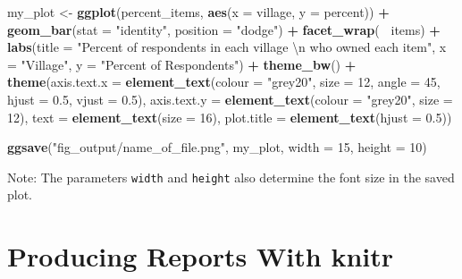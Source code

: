 \documentclass[]{book}
\newenvironment{Shaded}{\begin{snugshade}}{\end{snugshade}}
\newcommand{\KeywordTok}[1]{\textcolor[rgb]{0.13,0.29,0.53}{\textbf{#1}}}
\newcommand{\DataTypeTok}[1]{\textcolor[rgb]{0.13,0.29,0.53}{#1}}
\newcommand{\DecValTok}[1]{\textcolor[rgb]{0.00,0.00,0.81}{#1}}
\newcommand{\FloatTok}[1]{\textcolor[rgb]{0.00,0.00,0.81}{#1}}
\newcommand{\CharTok}[1]{\textcolor[rgb]{0.31,0.60,0.02}{#1}}
\newcommand{\StringTok}[1]{\textcolor[rgb]{0.31,0.60,0.02}{#1}}
\newcommand{\OperatorTok}[1]{\textcolor[rgb]{0.81,0.36,0.00}{\textbf{#1}}}
\newcommand{\NormalTok}[1]{#1}
\begin{document}
\begin{Shaded}
\begin{Highlighting}[]
\NormalTok{my_plot <-}\StringTok{ }\KeywordTok{ggplot}\NormalTok{(percent_items, }\KeywordTok{aes}\NormalTok{(}\DataTypeTok{x =}\NormalTok{ village, }\DataTypeTok{y =}\NormalTok{ percent)) }\OperatorTok{+}
\StringTok{    }\KeywordTok{geom_bar}\NormalTok{(}\DataTypeTok{stat =} \StringTok{"identity"}\NormalTok{, }\DataTypeTok{position =} \StringTok{"dodge"}\NormalTok{) }\OperatorTok{+}
\StringTok{    }\KeywordTok{facet_wrap}\NormalTok{(}\OperatorTok{~}\StringTok{ }\NormalTok{items) }\OperatorTok{+}
\StringTok{    }\KeywordTok{labs}\NormalTok{(}\DataTypeTok{title =} \StringTok{"Percent of respondents in each village }\CharTok{\textbackslash{}n}\StringTok{ who owned each item"}\NormalTok{,}
         \DataTypeTok{x =} \StringTok{"Village"}\NormalTok{,}
         \DataTypeTok{y =} \StringTok{"Percent of Respondents"}\NormalTok{) }\OperatorTok{+}
\StringTok{    }\KeywordTok{theme_bw}\NormalTok{() }\OperatorTok{+}
\StringTok{    }\KeywordTok{theme}\NormalTok{(}\DataTypeTok{axis.text.x =} \KeywordTok{element_text}\NormalTok{(}\DataTypeTok{colour =} \StringTok{"grey20"}\NormalTok{, }\DataTypeTok{size =} \DecValTok{12}\NormalTok{, }\DataTypeTok{angle =} \DecValTok{45}\NormalTok{, }\DataTypeTok{hjust =} \FloatTok{0.5}\NormalTok{, }\DataTypeTok{vjust =} \FloatTok{0.5}\NormalTok{),}
          \DataTypeTok{axis.text.y =} \KeywordTok{element_text}\NormalTok{(}\DataTypeTok{colour =} \StringTok{"grey20"}\NormalTok{, }\DataTypeTok{size =} \DecValTok{12}\NormalTok{),}
          \DataTypeTok{text =} \KeywordTok{element_text}\NormalTok{(}\DataTypeTok{size =} \DecValTok{16}\NormalTok{),}
          \DataTypeTok{plot.title =} \KeywordTok{element_text}\NormalTok{(}\DataTypeTok{hjust =} \FloatTok{0.5}\NormalTok{))}

\KeywordTok{ggsave}\NormalTok{(}\StringTok{"fig_output/name_of_file.png"}\NormalTok{, my_plot, }\DataTypeTok{width =} \DecValTok{15}\NormalTok{, }\DataTypeTok{height =} \DecValTok{10}\NormalTok{)}
\end{Highlighting}
\end{Shaded}

Note: The parameters \texttt{width} and \texttt{height} also determine
the font size in the saved plot.

\chapter{Producing Reports With knitr}\label{Reporting}
\end{document}
